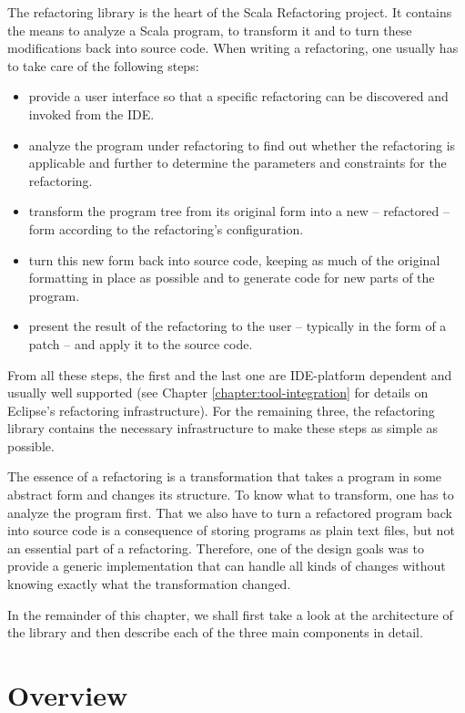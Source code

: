 
The refactoring library is the heart of the Scala Refactoring project. It contains the means to analyze a Scala program, to transform it and to turn these modifications back into source code. When writing a refactoring, one usually has to take care of the following steps:

\begin{itemize}
 \item provide a user interface so that a specific refactoring can be discovered and invoked from the IDE.
 \item analyze the program under refactoring to find out whether the refactoring is applicable and further to determine the parameters and constraints for the refactoring.
 \item transform the program tree from its original form into a new -- refactored -- form according to the refactoring's configuration.
 \item turn this new form back into source code, keeping as much of the original formatting in place as possible and to generate code for new parts of the program.
 \item present the result of the refactoring to the user -- typically in the form of a patch --  and apply it to the source code.
\end{itemize}

From all these steps, the first and the last one are IDE-platform dependent and usually well supported (see Chapter \ref{chapter:tool-integration} for details on Eclipse's refactoring infrastructure). For the remaining three, the refactoring library contains the necessary infrastructure to make these steps as simple as possible.

The essence of a refactoring is a transformation that takes a program in some abstract form and changes its structure. To know what to transform, one has to analyze the program first. That we also have to turn a refactored program back into source code is a consequence of storing programs as plain text files, but not an essential part of a refactoring. Therefore, one of the design goals was to provide a generic implementation that can handle all kinds of changes without knowing exactly what the transformation changed.

In the remainder of this chapter, we shall first take a look at the architecture of the library and then describe each of the three main components in detail.

\section{Overview}

